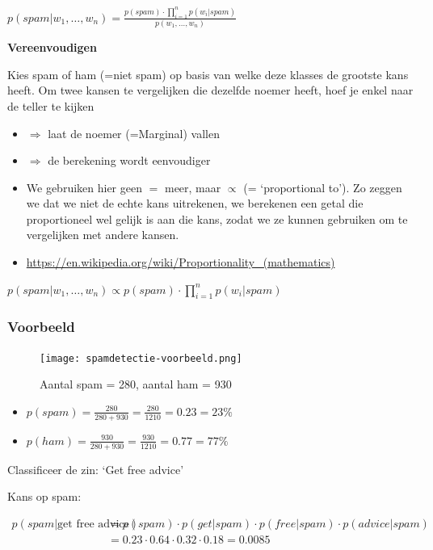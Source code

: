 \documentclass{article}
\begin{document}
\begin{center}
    $p(spam | w_1, \dots, w_n) = \frac{p(spam) \cdot \prod_{i=1}^n p(w_i | spam)}{p(w_1, \dots, w_n)}$
\end{center}

\textbf{Vereenvoudigen}

Kies spam of ham (=niet spam) op basis van welke deze klasses de grootste kans heeft.
Om twee kansen te vergelijken die dezelfde noemer heeft, hoef je enkel naar de teller te kijken 

\begin{itemize}
    \item $\Rightarrow$ laat de noemer (=Marginal) vallen
    \item $\Rightarrow$ de berekening wordt eenvoudiger
    \item We gebruiken hier geen $=$ meer, maar $\propto$ (= `proportional to'). Zo zeggen we dat we niet de echte kans uitrekenen, we berekenen een getal die proportioneel wel gelijk is aan die kans, zodat we ze kunnen gebruiken om te vergelijken met andere kansen.
    \item \url{https://en.wikipedia.org/wiki/Proportionality_(mathematics)}
\end{itemize}

$p(spam | w_1, \dots, w_n) \propto p(spam) \cdot \prod_{i=1}^n p(w_i | spam)$

\subsubsection{Voorbeeld}

\begin{figure}[H]
    \centering
    \texttt{[image: spamdetectie-voorbeeld.png]}
    \caption{Aantal spam = 280, aantal ham = 930}
\end{figure}

\begin{itemize}
    \item $p(spam) = \frac{280}{280 + 930} = \frac{280}{1210} = 0.23 = 23\%$
    \item $p(ham) = \frac{930}{280 + 930} = \frac{930}{1210} = 0.77 = 77\%$
\end{itemize}

Classificeer de zin: `Get free advice'

Kans op spam:

\begin{align*}
    p(spam | \text{get free advice}) & = p(spam) \cdot p(get|spam) \cdot p(free|spam) \cdot p(advice | spam)\\
    & = 0.23 \cdot 0.64 \cdot 0.32 \cdot 0.18 = 0.0085
\end{align*}
\end{document}
